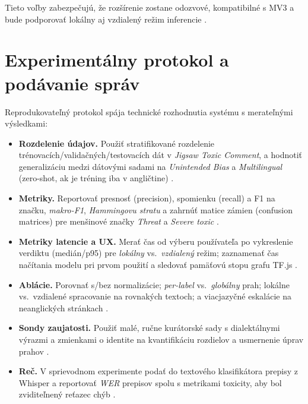 Tieto voľby zabezpečujú, že rozšírenie zostane odozvové, kompatibilné s MV3 a bude podporovať lokálny aj vzdialený režim inferencie \cite{tfjsToxicity}\cite{chromemv3}.

\section{Experimentálny protokol a podávanie správ}
Reprodukovateľný protokol spája technické rozhodnutia systému s merateľnými výsledkami:
\begin{itemize}
  \item \textbf{Rozdelenie údajov.} Použiť stratifikované rozdelenie trénovacích/validačných/testovacích dát v \emph{Jigsaw Toxic Comment}, a hodnotiť generalizáciu medzi dátovými sadami na \emph{Unintended Bias} a \emph{Multilingual} (zero-shot, ak je tréning iba v angličtine) \cite{jigsaw2018toxic}\cite{jigsaw2019bias}\cite{jigsaw2020multilingual}.
  \item \textbf{Metriky.} Reportovať presnosť (precision), spomienku (recall) a F1 na značku, \emph{makro-F1}, \emph{Hammingovu stratu} a zahrnúť matice zámien (confusion matrices) pre menšinové značky \emph{Threat} a \emph{Severe toxic} \cite{tsoumakas2007multilabel}\cite{jigsaw2018toxic}\cite{sikiandani2025browser}\cite{sklearnPRCurve}\cite{sklearnF1}\cite{sklearnHamming}.
  \item \textbf{Metriky latencie a UX.} Merať čas od výberu používateľa po vykreslenie verdiktu (medián/p95) pre \emph{lokálny} vs.\ \emph{vzdialený} režim; zaznamenať čas načítania modelu pri prvom použití a sledovať pamäťovú stopu grafu TF.js \cite{tfjsToxicity}\cite{chromemv3}.
  \item \textbf{Ablácie.} Porovnať s/bez normalizácie; \emph{per-label} vs.\ \emph{globálny} prah; lokálne vs.\ vzdialené spracovanie na rovnakých textoch; a viacjazyčné eskalácie na neanglických stránkach \cite{jigsaw2018toxic}\cite{jigsaw2019bias}\cite{jigsaw2020multilingual}\cite{tfjsToxicity}.
  \item \textbf{Sondy zaujatosti.} Použiť malé, ručne kurátorské sady s dialektálnymi výrazmi a zmienkami o identite na kvantifikáciu rozdielov a usmernenie úprav prahov \cite{jigsaw2019bias}\cite{borkan2019nuanced}\cite{sap2019racialbias}\cite{hatecheck2021}.
  \item \textbf{Reč.} V sprievodnom experimente podať do textového klasifikátora prepisy z Whisper a reportovať \emph{WER} prepisov spolu s metrikami toxicity, aby bol zviditeľnený reťazec chýb \cite{sikiandani2025browser}\cite{radford2022whisper}.
\end{itemize}